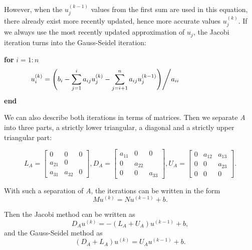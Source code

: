 However, when the $u_j^{(k-1)}$ values from the first sum are used in this equation, there already exist more recently updated, hence more accurate values $u_j^{(k)}$. If we always use the most recently updated approximation of $u_j$, the Jacobi iteration turns into the Gauss-Seidel iteration:

\noindent\hspace*{15mm}\textbf{for } $i = 1:n$
\begin{align}
\hspace*{-25mm} u_i^{(k)} = \Bigg ( b_i - \sum_{j = 1}^{i} a_{ij}u_j^{(k)} - \sum_{j = i+1}^{n} a_{ij} u_j^{(k-1)} \Bigg ) \Bigg / a_{ii}
\end{align}
\hspace*{15mm}\textbf{end}

We can also describe both iterations in terms of matrices. Then we separate \textit{A} into three parts, a strictly lower triangular, a diagonal and a strictly upper triangular part:

\begin{equation}
L_A = 
\begin{bmatrix}
0 & 0 & 0 \\
a_{21} & 0 & \\
a_{31} & a_{32} & 0
\end{bmatrix}, D_A = 
\begin{bmatrix}
a_{11} & 0 & 0 \\
0 & a_{22} & \\
0 & 0 & a_{33}
\end{bmatrix}, U_A = 
\begin{bmatrix}
0 & a_{12} & a_{13} \\
0 & 0 & a_{23}\\
0 & 0 & 0
\end{bmatrix}.
\end{equation}

With such a separation of \textit{A}, the iterations can be written in the form
\begin{equation}
M u^{(k)} = N u^{(k-1)} + b.
\end{equation}

Then the Jacobi method \cite{golub1996matrix} can be written as
\begin{equation}
D_A u^{(k)} = -(L_A + U_A) u^{(k-1)} + b,
\end{equation}
and the Gauss-Seidel method as
\begin{equation}
(D_A + L_A) u^{(k)} = U_A u^{(k-1)} + b.
\end{equation}

